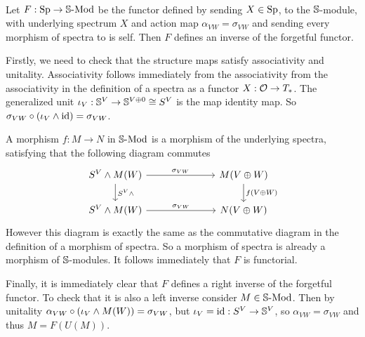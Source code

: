 \begin{exercise}[4]\ 

Let $F: \Sp \to \SMod$ be the functor defined by sending 
$X \in \Sp$, to the $\S$-module, with underlying spectrum $X$ and action map 
$\alpha_{VW} = \sigma_{VW}$ and sending every morphism of spectra to is self.
Then $F$ defines an inverse of the forgetful functor. 

Firstly, we need to check that the structure maps satisfy associativity and
unitality. Associativity follows immediately from the associativity from the
associativity in the definition of a spectra as a functor $X: \O \to T_*$. 
The generalized unit $\iota_V : \S^V \to \S^{V \oplus 0} \cong S^V$ is the map
identity map. So $\sigma_{VW} \circ (\iota_V \smsh \id) = \sigma_{VW}$.

A morphism $f: M \to N$ in $\SMod$ is a morphism of the underlying spectra, satisfying that the following
diagram commutes
\[ \begin{tikzcd}[column sep = 7em]
S^V \smsh M(W) \ar[r, "\sigma_{VW}"] \ar[d, "S^V \smsh"] 
& M(V\oplus W) \ar[d, "f(V\oplus W)"] \\
S^V \smsh M(W) \ar[r, "\sigma_{VW}"] 
& N(V\oplus W)
\end{tikzcd} \] 
However this diagram is exactly the same as the commutative diagram in the
definition of a morphism of spectra. So a morphism of spectra is already a
morphism of $\S$-modules. It follows immediately that  $F$ is functorial. 

Finally, it is immediately clear that $F$ defines a right inverse of the
forgetful functor. To check that it is also a left inverse consider $M \in
\SMod$. Then by unitality $\alpha_{VW} \circ (\iota_V \smsh M(W)) =
\sigma_{VW}$, but $\iota_V = \id : S^V \to \S^V$, so $\alpha_{VW} =
\sigma_{VW}$ and thus $M = F(U(M))$.
\end{exercise}


